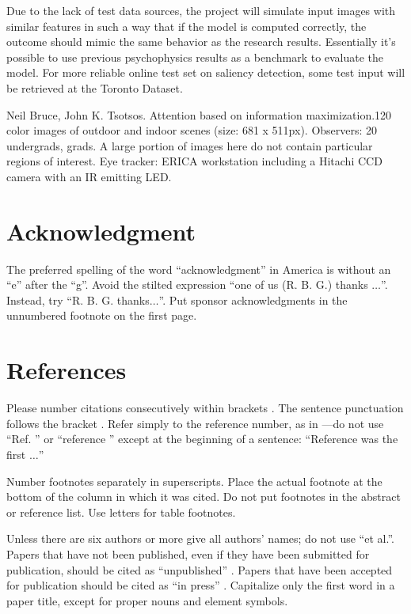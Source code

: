 \documentclass[conference]{IEEEtran}
\begin{document}
Due to the lack of test data sources, the project will simulate input images with similar features in such a way that if the model is computed correctly, the outcome should mimic the same behavior as the research results. Essentially it’s possible to use previous psychophysics results as a benchmark to evaluate the model. For more reliable online test set on saliency detection, some test input will be retrieved at the Toronto Dataset.

Neil Bruce, John K. Tsotsos. Attention based on information maximization.120 color images of outdoor and indoor scenes (size: 681 x 511px). Observers: 20 undergrads, grads. A large portion of images here do not contain particular regions of interest. Eye tracker: ERICA workstation including a Hitachi CCD camera with an IR emitting LED.

\section*{Acknowledgment}

The preferred spelling of the word ``acknowledgment'' in America is without 
an ``e'' after the ``g''. Avoid the stilted expression ``one of us (R. B. 
G.) thanks $\ldots$''. Instead, try ``R. B. G. thanks$\ldots$''. Put sponsor 
acknowledgments in the unnumbered footnote on the first page.

\section*{References}

Please number citations consecutively within brackets \cite{b1}. The 
sentence punctuation follows the bracket \cite{b2}. Refer simply to the reference 
number, as in \cite{b3}---do not use ``Ref. \cite{b3}'' or ``reference \cite{b3}'' except at 
the beginning of a sentence: ``Reference \cite{b3} was the first $\ldots$''

Number footnotes separately in superscripts. Place the actual footnote at 
the bottom of the column in which it was cited. Do not put footnotes in the 
abstract or reference list. Use letters for table footnotes.

Unless there are six authors or more give all authors' names; do not use 
``et al.''. Papers that have not been published, even if they have been 
submitted for publication, should be cited as ``unpublished'' \cite{b4}. Papers 
that have been accepted for publication should be cited as ``in press'' \cite{b5}. 
Capitalize only the first word in a paper title, except for proper nouns and 
element symbols.
\end{document}
